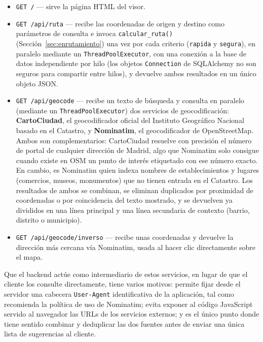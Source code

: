 \begin{itemize}
    \item \texttt{GET /} — sirve la página HTML del visor.
    \item \texttt{GET /api/ruta} — recibe las coordenadas de origen y destino como parámetros de consulta e invoca \texttt{calcular\_ruta()} (Sección~\ref{sec:enrutamiento}) una vez por cada criterio (\texttt{rapida} y \texttt{segura}), en paralelo mediante un \texttt{ThreadPoolExecutor}, con una conexión a la base de datos independiente por hilo (los objetos \texttt{Connection} de SQLAlchemy no son seguros para compartir entre hilos), y devuelve ambos resultados en un único objeto JSON.
    \item \texttt{GET /api/geocode} — recibe un texto de búsqueda y consulta en paralelo (mediante un \texttt{ThreadPoolExecutor}) dos servicios de geocodificación: \textbf{CartoCiudad}, el geocodificador oficial del Instituto Geográfico Nacional basado en el Catastro, y \textbf{Nominatim}, el geocodificador de OpenStreetMap. Ambos son complementarios: CartoCiudad resuelve con precisión el número de portal de cualquier dirección de Madrid, algo que Nominatim solo consigue cuando existe en OSM un punto de interés etiquetado con ese número exacto. En cambio, es Nominatim quien indexa nombres de establecimientos y lugares (comercios, museos, monumentos) que no tienen entrada en el Catastro. Los resultados de ambos se combinan, se eliminan duplicados por proximidad de coordenadas o por coincidencia del texto mostrado, y se devuelven ya divididos en una línea principal y una línea secundaria de contexto (barrio, distrito o municipio).
    \item \texttt{GET /api/geocode/inverso} — recibe unas coordenadas y devuelve la dirección más cercana vía Nominatim, usada al hacer clic directamente sobre el mapa.
\end{itemize}

Que el backend actúe como intermediario de estos servicios, en lugar de que el cliente los consulte directamente, tiene varios motivos: permite fijar desde el servidor una cabecera \texttt{User-Agent} identificativa de la aplicación, tal como recomienda la política de uso de Nominatim; evita exponer al código JavaScript servido al navegador las URLs de los servicios externos; y es el único punto donde tiene sentido combinar y deduplicar las dos fuentes antes de enviar una única lista de sugerencias al cliente.


